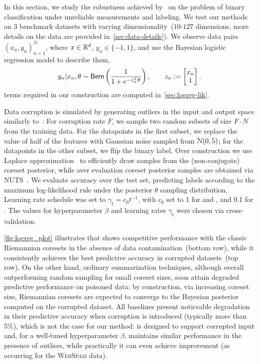 In this section, we study the robustness achieved by~\bcores{} on the problem of binary classification  under unreliable measurements and labeling. We test our methods on 3 benchmark datasets with varying dimensionality~($10$-$127$ dimensions, more details on the data are provided in~\cref{sec:data-details}). We observe data pairs $(x_n, y_n)_{n=1}^{N}$, where $x\in\mathbb{R}^{d}$, $y_n \in \{-1,1\}$, and use the Bayesian logistic regression model to describe them,
\[
y_n | x_n, \theta \sim {\sf{Bern}} \left( \frac{1}{1+e^{-z_n^T \theta}}\right),
\qquad 
z_n:=\begin{bmatrix}
x_n \\
1
\end{bmatrix}.
\]
\blik{} terms required in our construction are computed in~\cref{sec:logreg-lik}. 

Data corruption is simulated by generating outliers in the input and output space similarly to~\cite{futami18}: For corruption rate $F$, we sample two random subsets of size $F\cdot N$ from the training data.  For the datapoints in the first subset, we replace the value of half of the features with Gaussian noise sampled \iid from $\mathcal{N}(0,5)$; for the datapoints in the other subset, we flip the binary label. Over construction we use Laplace approximation~\cite{mackay03} to efficiently draw samples from the (non-conjugate) coreset posterior, while over evaluation coreset posterior samples are obtained via NUTS~\cite{hoffman14}. We evaluate accuracy over the test set, predicting labels according to the maximum log-likelihood rule under the posterior $\theta$ sampling distribution. Learning rate schedule was set to $\gamma_t=c_0 t^{-1}$, with $c_0$ set to 1 for \sparsevi{} and \bcores{}, and 0.1 for \psvi. %
The values for hyperparameter $\beta$ and learning rates $\gamma_t$ were chosen via cross-validation. 

\cref{fig:logreg_plot} illustrates that \bcores{} shows competitive performance with the classic Riemannian coresets in the absence of data contamination~(bottom row), while it consistently achieves the best predictive accuracy in corrupted datasets~(top row).  On the other hand, ordinary summarization techniques, although overall outperforming random sampling for small coreset sizes, soon attain degraded predictive performance on poisoned data: by construction, via increasing coreset size, Riemannian coresets are expected to converge to the Bayesian posterior computed on the corrupted dataset. All baselines present noticeable degradation in their predictive accuracy when corruption is introduced (typically more than $5\%$), which is not the case for our method: \bcores{} is designed to support corrupted input and, for a well-tuned hyperparameter $\beta$, maintains similar performance in the presence of outliers, while practically it can even achieve improvement (as occurring for the \textsc{WebSpam} data).


